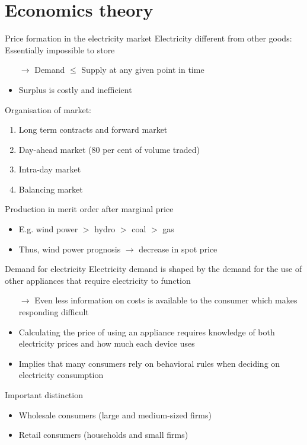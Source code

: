 \section{Economics theory}
\begin{frame}{Price formation in the electricity market}
Electricity different from other goods: Essentially impossible to store
\begin{itemize}
    \item[$\rightarrow$] Demand $\leq$ Supply at any given point in time
    \item Surplus is costly and inefficient
\end{itemize}
Organisation of market:
\begin{enumerate}
    \item Long term contracts and forward market
    \item Day-ahead market (80 per cent of volume traded)
    \item Intra-day market
    \item Balancing market
\end{enumerate}
Production in merit order after marginal price
\begin{itemize}
    \item E.g. wind power $>$ hydro $>$ coal $>$ gas
    \item Thus, wind power prognosis $\rightarrow$ decrease in spot price
\end{itemize}
\end{frame}


\begin{frame}{Demand for electricity}
Electricity demand is shaped by the demand for the use of other appliances that require electricity to function
\begin{itemize}
    \item[$\rightarrow$] Even less information on costs is available to the consumer which makes responding difficult
    \item Calculating the price of using an appliance requires knowledge of both electricity prices and how much each device uses
    \item Implies that many consumers rely on behavioral rules when deciding on electricity consumption
\end{itemize}
Important distinction
\begin{itemize}
    \item Wholesale consumers (large and medium-sized firms)
    \item Retail consumers (households and small firms)
\end{itemize}
\end{frame}


